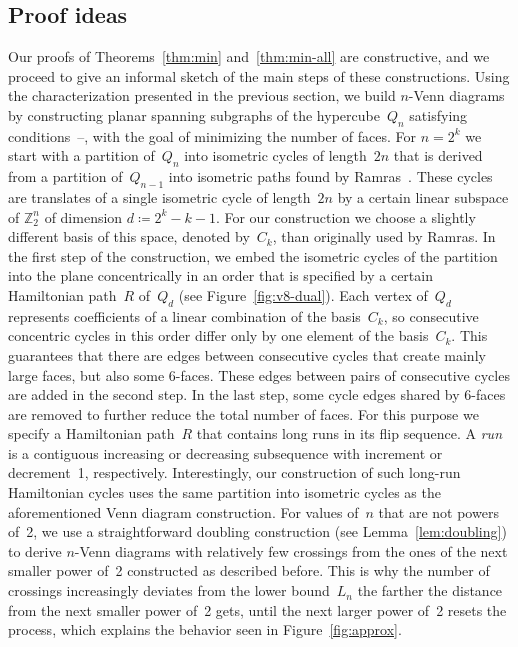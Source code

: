 \documentclass[11pt]{article}
\newcommand{\defi}[1]{\textcolor{defblue}{\emph{#1}}}
\newcommand*\circled[1]{\tikz[baseline=(char.base)]{
            \node[shape=circle,draw,inner sep=1pt] (char) {#1};}}
\newcommand{\ass}{\coloneqq}
\begin{document}
\subsection{Proof ideas}
\label{sec:ideas}
%
Our proofs of Theorems~\ref{thm:min} and~\ref{thm:min-all} are constructive, and we proceed to give an informal sketch of the main steps of these constructions.
%
Using the characterization presented in the previous section, we build $n$-Venn diagrams by constructing planar spanning subgraphs of the hypercube~$Q_n$ satisfying conditions~\circled{1}--\circled{3}, with the goal of minimizing the number of faces.
%
For $n=2^k$ we start with a partition of~$Q_n$ into isometric cycles of length~$2n$ that is derived from a partition of~$Q_{n-1}$ into isometric paths found by Ramras~\cite{MR1152451}.
These cycles are translates of a single isometric cycle of length~$2n$ by a certain linear subspace of $\mathbb{Z}_2^n$ of dimension $d\ass 2^k-k-1$.
For our construction we choose a slightly different basis of this space, denoted by~$C_k$, than originally used by Ramras.
%
In the first step of the construction, we embed the isometric cycles of the partition into the plane concentrically in an order that is specified by a  certain Hamiltonian path~$R$ of~$Q_d$ (see Figure~\ref{fig:v8-dual}).
Each vertex of~$Q_d$ represents coefficients of a linear combination of the basis~$C_k$, so consecutive concentric cycles in this order differ only by one element of the basis~$C_k$.
This guarantees that there are edges between consecutive cycles that create mainly large faces, but also some 6-faces.
These edges between pairs of consecutive cycles are added in the second step.
%
In the last step, some cycle edges shared by 6-faces are removed to further reduce the total number of faces.
For this purpose we specify a Hamiltonian path~$R$ that contains long runs in its flip sequence.
A \defi{run} is a contiguous increasing or decreasing subsequence with increment or decrement~1, respectively.
Interestingly, our construction of such long-run Hamiltonian cycles uses the same partition into isometric cycles as the aforementioned Venn diagram construction.
%
For values of~$n$ that are not powers of~2, we use a straightforward doubling construction (see Lemma~\ref{lem:doubling}) to derive $n$-Venn diagrams with relatively few crossings from the ones of the next smaller power of~2 constructed as described before.
This is why the number of crossings increasingly deviates from the lower bound~$L_n$ the farther the distance from the next smaller power of~2 gets, until the next larger power of~2 resets the process, which explains the behavior seen in Figure~\ref{fig:approx}.
%
%
\end{document}
